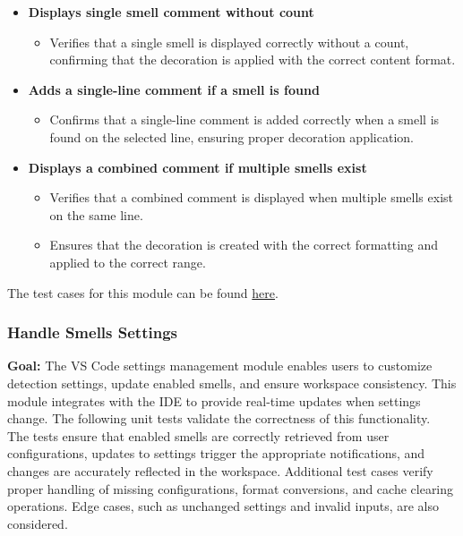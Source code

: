\documentclass[12pt, titlepage]{article}
\begin{document}
\begin{itemize}
    \item \textbf{Displays single smell comment without count}
    \begin{itemize}
        \item Verifies that a single smell is displayed correctly without a count, confirming that the decoration is applied with the correct content format.
    \end{itemize}

    \item \textbf{Adds a single-line comment if a smell is found}
    \begin{itemize}
        \item Confirms that a single-line comment is added correctly when a smell is found on the selected line, ensuring proper decoration application.
    \end{itemize}

    \item \textbf{Displays a combined comment if multiple smells exist}
    \begin{itemize}
        \item Verifies that a combined comment is displayed when multiple smells exist on the same line.
        \item Ensures that the decoration is created with the correct formatting and applied to the correct range.
    \end{itemize}
\end{itemize}

\noindent The test cases for this module can be found \href{https://github.com/ssm-lab/capstone--sco-vs-code-plugin/blob/plugin-multi-file/test/ui/lineSelection.test.ts}{here}.

\subsubsection{Handle Smells Settings}

\textbf{Goal:} The VS Code settings management module enables users to customize detection settings, update enabled smells, and ensure workspace consistency. This module integrates with the IDE to provide real-time updates when settings change. The following unit tests validate the correctness of this functionality.\\

\noindent The tests ensure that enabled smells are correctly retrieved from user configurations, updates to settings trigger the appropriate notifications, and changes are accurately reflected in the workspace. Additional test cases verify proper handling of missing configurations, format conversions, and cache clearing operations. Edge cases, such as unchanged settings and invalid inputs, are also considered.\\
\end{document}
